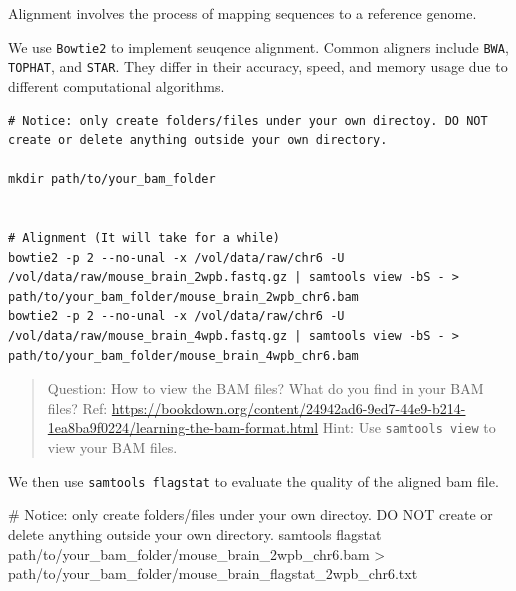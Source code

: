 \documentclass[
]{book}
\newenvironment{Shaded}{\begin{snugshade}}{\end{snugshade}}
\newcommand{\NormalTok}[1]{#1}
\begin{document}
Alignment involves the process of mapping sequences to a reference genome.

We use \texttt{Bowtie2} to implement seuqence alignment. Common aligners include \texttt{BWA}, \texttt{TOPHAT}, and \texttt{STAR}. They differ in their accuracy, speed, and memory usage due to different computational algorithms.

\begin{verbatim}
# Notice: only create folders/files under your own directoy. DO NOT create or delete anything outside your own directory.

mkdir path/to/your_bam_folder


# Alignment (It will take for a while)
bowtie2 -p 2 --no-unal -x /vol/data/raw/chr6 -U /vol/data/raw/mouse_brain_2wpb.fastq.gz | samtools view -bS - > path/to/your_bam_folder/mouse_brain_2wpb_chr6.bam 
bowtie2 -p 2 --no-unal -x /vol/data/raw/chr6 -U /vol/data/raw/mouse_brain_4wpb.fastq.gz | samtools view -bS - > path/to/your_bam_folder/mouse_brain_4wpb_chr6.bam
\end{verbatim}

\begin{quote}
Question: How to view the BAM files? What do you find in your BAM files?
Ref: \url{https://bookdown.org/content/24942ad6-9ed7-44e9-b214-1ea8ba9f0224/learning-the-bam-format.html}
Hint: Use \texttt{samtools\ view} to view your BAM files.
\end{quote}

We then use \texttt{samtools\ flagstat} to evaluate the quality of the aligned bam file.

\begin{Shaded}
\begin{Highlighting}[]
\NormalTok{\# Notice: only create folders/files under your own directoy. DO NOT create or delete anything outside your own directory.}
\NormalTok{samtools flagstat path/to/your\_bam\_folder/mouse\_brain\_2wpb\_chr6.bam  \textgreater{} path/to/your\_bam\_folder/mouse\_brain\_flagstat\_2wpb\_chr6.txt}
\end{Highlighting}
\end{Shaded}
\end{document}
